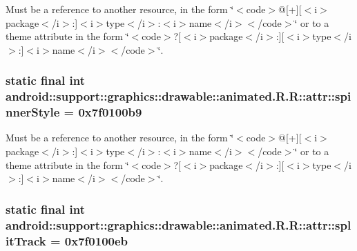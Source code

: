 Must be a reference to another resource, in the form \char`\"{}$<$code$>$@\mbox{[}+\mbox{]}\mbox{[}$<$i$>$package$<$/i$>$:\mbox{]}$<$i$>$type$<$/i$>$:$<$i$>$name$<$/i$>$$<$/code$>$\char`\"{} or to a theme attribute in the form \char`\"{}$<$code$>$?\mbox{[}$<$i$>$package$<$/i$>$:\mbox{]}\mbox{[}$<$i$>$type$<$/i$>$:\mbox{]}$<$i$>$name$<$/i$>$$<$/code$>$\char`\"{}. \hypertarget{classandroid_1_1support_1_1graphics_1_1drawable_1_1animated_1_1_r_1_1attr_8b25c722707365ff5121f654c28f5929}{
\subsubsection[{spinnerStyle}]{\setlength{\rightskip}{0pt plus 5cm}static final int android::support::graphics::drawable::animated.R.R::attr::spinnerStyle = 0x7f0100b9}}
\label{classandroid_1_1support_1_1graphics_1_1drawable_1_1animated_1_1_r_1_1attr_8b25c722707365ff5121f654c28f5929}


Must be a reference to another resource, in the form \char`\"{}$<$code$>$@\mbox{[}+\mbox{]}\mbox{[}$<$i$>$package$<$/i$>$:\mbox{]}$<$i$>$type$<$/i$>$:$<$i$>$name$<$/i$>$$<$/code$>$\char`\"{} or to a theme attribute in the form \char`\"{}$<$code$>$?\mbox{[}$<$i$>$package$<$/i$>$:\mbox{]}\mbox{[}$<$i$>$type$<$/i$>$:\mbox{]}$<$i$>$name$<$/i$>$$<$/code$>$\char`\"{}. \hypertarget{classandroid_1_1support_1_1graphics_1_1drawable_1_1animated_1_1_r_1_1attr_367bd600357cc16aadfdb95faeb9dc1e}{
\subsubsection[{splitTrack}]{\setlength{\rightskip}{0pt plus 5cm}static final int android::support::graphics::drawable::animated.R.R::attr::splitTrack = 0x7f0100eb}}
\label{classandroid_1_1support_1_1graphics_1_1drawable_1_1animated_1_1_r_1_1attr_367bd600357cc16aadfdb95faeb9dc1e}


